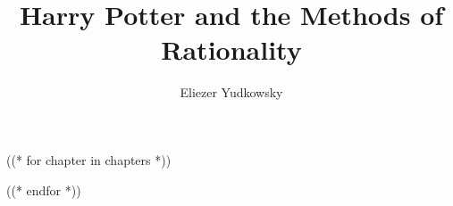 \documentclass[((( font_size|escape_tex )))pt,((( paper_size|escape_tex ))),((( paper_sides|escape_tex )))]{memoir}
\begin{document}
\title{Harry Potter and the Methods of Rationality}
\author{Eliezer Yudkowsky}
\beforechapters

((* for chapter in chapters *))

((* endfor *))
\end{document}
